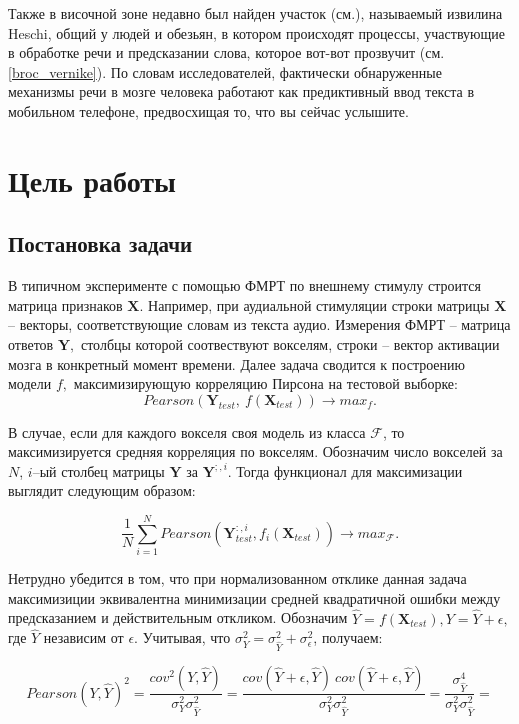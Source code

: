 \documentclass[pdftex,ptm,12pt,a4paper]{report}
\theoremstyle{definition}
\begin{document}
Также в височной зоне недавно был найден участок (см.\cite{kikuchi2017sequence}), называемый извилина Heschi, общий у людей и обезьян, в котором происходят процессы, участвующие в обработке речи и предсказании слова, которое вот-вот прозвучит (см. \ref{broc_vernike}). По словам исследователей, фактически обнаруженные механизмы речи в мозге человека работают как предиктивный ввод текста в мобильном телефоне, предвосхищая то, что вы сейчас услышите.

\chapter{Цель работы}

\section{Постановка задачи}

В типичном эксперименте с помощью ФМРТ по внешнему стимулу строится матрица признаков $\textbf{X}.$ Например, при аудиальной стимуляции строки матрицы $\textbf{X}$ -- векторы, соответствующие словам из текста аудио. Измерения ФМРТ -- матрица ответов $\textbf{Y},$ столбцы которой соотвествуют вокселям, строки -- вектор активации мозга в конкретный момент времени. Далее задача сводится к построению модели $f,$ максимизирующую корреляцию Пирсона на тестовой выборке:
$$Pearson(\textbf{Y}_{test},\ f(\textbf{X}_{test})) \rightarrow max_{f}.$$

В случае, если для каждого вокселя своя модель из класса $\mathcal{F}$, то максимизируется средняя корреляция по вокселям. Обозначим число вокселей за $N$, $i$--ый столбец матрицы $\textbf{Y}$ за $\textbf{Y}^{;,i}$. Тогда функционал для максимизации выглядит следующим образом:

$$\frac{1}{N} \sum_{i=1}^{N} Pearson(\textbf{Y}_{test}^{:,i}, f_{i}(\textbf{X}_{test})) \rightarrow max_{\mathcal{F}}.$$

Нетрудно убедится в том, что при нормализованном отклике данная задача максимизиции эквивалентна минимизации средней квадратичной ошибки между предсказанием и действительным откликом. Обозначим $\hat{Y} = f(\mathbf{X}_{test}), Y = \hat{Y} + \epsilon,$ где $\hat{Y}$ независим от $\epsilon$. Учитывая, что $\sigma^2_{Y} = \sigma^2_{\hat{Y}} + \sigma^2_{\epsilon}$, получаем:

$$Pearson(Y, \hat{Y})^2 = \frac{cov^2(Y, \hat{Y})}{\sigma^2_{Y}\sigma^2_{\hat{Y}}} =  \frac{cov(\hat{Y} + \epsilon, \hat{Y})\ cov(\hat{Y} + \epsilon, \hat{Y})}{\sigma^2_{Y}\sigma^2_{\hat{Y}}} = \frac{\sigma^4_{\hat{Y}}}{\sigma^2_{Y}\sigma^2_{\hat{Y}}} = $$
\end{document}
